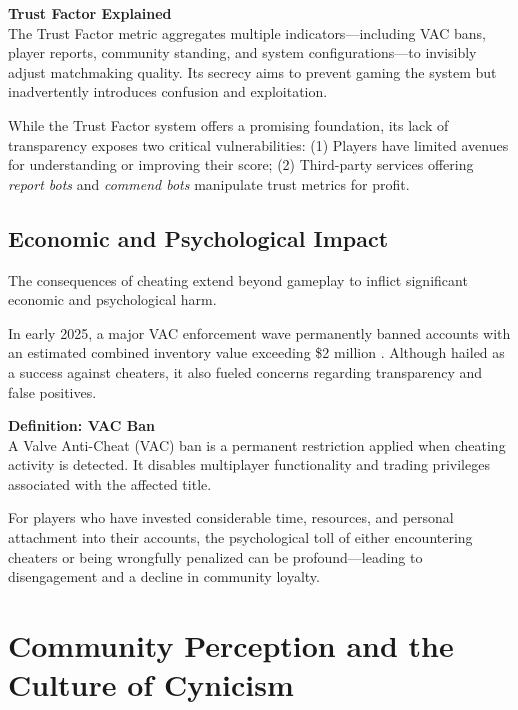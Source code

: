 \begin{tcolorbox}[colback=gray!10, colframe=gray!50, boxrule=0pt, sharp corners, width=\linewidth, left=1mm, right=1mm, top=0.5mm, bottom=0.5mm]
\textbf{Trust Factor Explained} \\
The Trust Factor metric aggregates multiple indicators—including VAC bans, player reports, community standing, and system configurations—to invisibly adjust matchmaking quality.  
Its secrecy aims to prevent gaming the system but inadvertently introduces confusion and exploitation.
\end{tcolorbox}

While the Trust Factor system offers a promising foundation, its lack of transparency exposes two critical vulnerabilities:  
(1) Players have limited avenues for understanding or improving their score;  
(2) Third-party services offering \textit{report bots} and \textit{commend bots} manipulate trust metrics for profit.

\subsection{Economic and Psychological Impact}

The consequences of cheating extend beyond gameplay to inflict significant economic and psychological harm.

In early 2025, a major VAC enforcement wave permanently banned accounts with an estimated combined inventory value exceeding \$2 million \cite{ggscore2025vacban}.  
Although hailed as a success against cheaters, it also fueled concerns regarding transparency and false positives.

\begin{tcolorbox}[colback=gray!10, colframe=gray!50, boxrule=0pt, sharp corners, width=\linewidth, left=1mm, right=1mm, top=0.5mm, bottom=0.5mm]
\textbf{Definition: VAC Ban} \\
A Valve Anti-Cheat (VAC) ban is a permanent restriction applied when cheating activity is detected.  
It disables multiplayer functionality and trading privileges associated with the affected title.
\end{tcolorbox}

For players who have invested considerable time, resources, and personal attachment into their accounts, the psychological toll of either encountering cheaters or being wrongfully penalized can be profound—leading to disengagement and a decline in community loyalty.

\section{Community Perception and the Culture of Cynicism}

